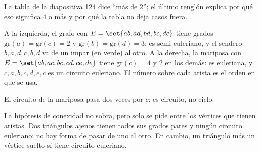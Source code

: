 \documentclass[11pt,letterpaper]{article}
\begin{document}
La tabla de la diapositiva 124 dice ``más de $2$''; el último renglón
explica por qué eso significa $4$ o más y por qué la tabla no deja
casos fuera.

\begin{ejemplo}[Diapositivas 115 y 119]
  \label{ej:euler-teoria}
  A la izquierda, el grafo con $E = \set{ab, ad, bd, bc, dc}$ tiene
  grados $\text{gr}(a) = \text{gr}(c) = 2$ y
  $\text{gr}(b) = \text{gr}(d) = 3$: es semi-euleriano, y el sendero
  $b, a, d, c, b, d$ va de un impar (en verde) al otro. A la derecha,
  la mariposa con $E = \set{ab, ac, bc, cd, ce, de}$ tiene
  $\text{gr}(c) = 4$ y $2$ en los demás: es euleriana, y
  $c, a, b, c, d, e, c$ es un circuito euleriano. El número sobre cada
  arista es el orden en que se usa.
  \begin{center}
  \end{center}
  El circuito de la mariposa pasa dos veces por $c$: es circuito, no
  ciclo.
\end{ejemplo}

\begin{ojo}
  La hipótesis de conexidad no sobra, pero solo se pide entre los
  vértices que tienen aristas. Dos triángulos ajenos tienen todos sus
  grados pares y ningún circuito euleriano: no hay forma de pasar de
  uno al otro. En cambio, un triángulo más un vértice suelto sí tiene
  circuito euleriano.
\end{ojo}
\end{document}
